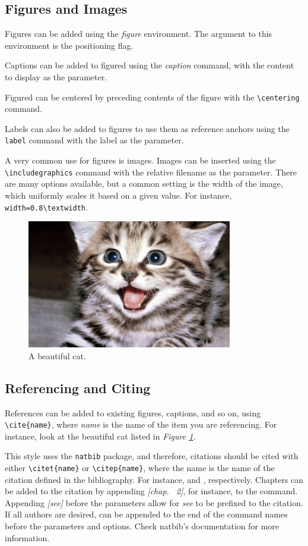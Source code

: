 \subsection{Figures and Images}
Figures can be added using the \textit{figure} environment.  The argument to this environment is the positioning flag.

Captions can be added to figured using the \textit{caption} command, with the content to display as the parameter.

Figured can be centered by preceding contents of the figure with the \verb;\centering; command.

Labels can also be added to figures to use them as reference anchors using the \verb;label; command with the label as the parameter.

A very common use for figures is images.  Images can be inserted using the \verb;\includegraphics; command with the relative filename as the parameter.  There are many options available, but a common setting is the width of the image, which uniformly scales it based on a given value.  For instance, \verb;width=0.8\textwidth;.
\begin{figure}[H]
	\centering
	\includegraphics[width=0.8\textwidth]{cat.jpg}
	\caption{A beautiful cat.}
	\label{fig:beautiful_cat}
\end{figure}

\subsection{Referencing and Citing}
References can be added to existing figures, captions, and so on, using \verb;\cite{name};, where \textit{name} is the name of the item you are referencing.  For instance, look at the beautiful cat listed in \textit{Figure \ref{fig:beautiful_cat}}.

This style uses the \verb;natbib; package, and therefore, citations should be cited with either \verb;\citet{name}; or \verb;\citep{name};, where the name is the name of the citation defined in the bibliography.  For instance, \citet{gamma1994design} and \citep{gamma1994design}, respectively.  Chapters can be added to the citation by appending \textit{[chap. ~2]}, for instance, to the command.  Appending \textit{[see]} before the parameters allow for \textit{see} to be prefixed to the citation.  If all authors are desired, \* can be appended to the end of the command names before the parameters and options.  Check natbib's documentation for more information.
